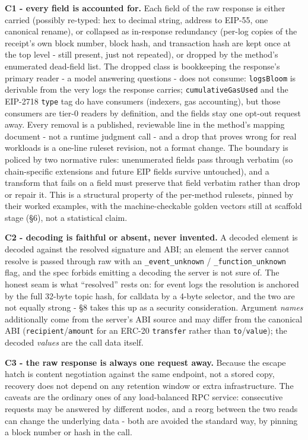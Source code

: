 \documentclass[11pt]{article}
\newcommand{\code}[1]{\texttt{#1}}
\begin{document}
\textbf{C1 - every field is accounted for.} Each field of the raw response is either carried (possibly re-typed: hex to decimal string, address to EIP-55, one canonical rename), or collapsed as in-response redundancy (per-log copies of the receipt's own block number, block hash, and transaction hash are kept once at the top level - still present, just not repeated), or dropped by the method's enumerated dead-field list. The dropped class is bookkeeping the response's primary reader - a model answering questions - does not consume: \code{logsBloom} is derivable from the very logs the response carries; \code{cumulativeGasUsed} and the EIP-2718 \code{type} tag do have consumers (indexers, gas accounting), but those consumers are tier-0 readers by definition, and the fields stay one opt-out request away. Every removal is a published, reviewable line in the method's mapping document - not a runtime judgment call - and a drop that proves wrong for real workloads is a one-line ruleset revision, not a format change. The boundary is policed by two normative rules: unenumerated fields pass through verbatim (so chain-specific extensions and future EIP fields survive untouched), and a transform that fails on a field must preserve that field verbatim rather than drop or repair it. This is a structural property of the per-method rulesets, pinned by their worked examples, with the machine-checkable golden vectors still at scaffold stage (\S6), not a statistical claim.

\textbf{C2 - decoding is faithful or absent, never invented.} A decoded element is decoded against the resolved signature and ABI; an element the server cannot resolve is passed through raw with an \code{\_event\_unknown} / \code{\_function\_unknown} flag, and the spec forbids emitting a decoding the server is not sure of. The honest seam is what ``resolved'' rests on: for event logs the resolution is anchored by the full 32-byte topic hash, for calldata by a 4-byte selector, and the two are not equally strong - \S8 takes this up as a security consideration. Argument \emph{names} additionally come from the server's ABI source and may differ from the canonical ABI (\code{recipient}/\code{amount} for an ERC-20 \code{transfer} rather than \code{to}/\code{value}); the decoded \emph{values} are the call data itself.

\textbf{C3 - the raw response is always one request away.} Because the escape hatch is content negotiation against the same endpoint, not a stored copy, recovery does not depend on any retention window or extra infrastructure. The caveats are the ordinary ones of any load-balanced RPC service: consecutive requests may be answered by different nodes, and a reorg between the two reads can change the underlying data - both are avoided the standard way, by pinning a block number or hash in the call.
\end{document}
